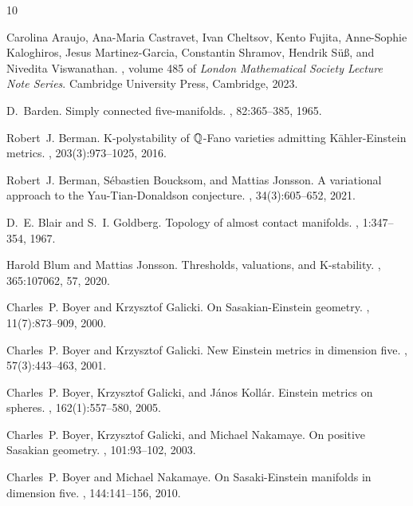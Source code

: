 \documentclass[12pt]{amsart}
\theoremstyle{definition}
\theoremstyle{remark}
\begin{document}
   
\begin{thebibliography}{10}


Carolina Araujo, Ana-Maria Castravet, Ivan Cheltsov, Kento Fujita, Anne-Sophie
  Kaloghiros, Jesus Martinez-Garcia, Constantin Shramov, Hendrik S\"u\ss, and
  Nivedita Viswanathan.
, volume 485 of {\em
  London Mathematical Society Lecture Note Series}.
\newblock Cambridge University Press, Cambridge, 2023.

D.~Barden.
\newblock Simply connected five-manifolds.
, 82:365--385, 1965.

Robert~J. Berman.
\newblock K-polystability of {${\Bbb Q}$}-{F}ano varieties admitting
  {K}\"ahler-{E}instein metrics.
, 203(3):973--1025, 2016.

Robert~J. Berman, S\'ebastien Boucksom, and Mattias Jonsson.
\newblock A variational approach to the {Y}au-{T}ian-{D}onaldson conjecture.
, 34(3):605--652, 2021.

D.~E. Blair and S.~I. Goldberg.
\newblock Topology of almost contact manifolds.
, 1:347--354, 1967.

Harold Blum and Mattias Jonsson.
\newblock Thresholds, valuations, and {K}-stability.
, 365:107062, 57, 2020.

Charles~P. Boyer and Krzysztof Galicki.
\newblock On {S}asakian-{E}instein geometry.
, 11(7):873--909, 2000.

Charles~P. Boyer and Krzysztof Galicki.
\newblock New {E}instein metrics in dimension five.
, 57(3):443--463, 2001.

Charles~P. Boyer, Krzysztof Galicki, and J\'{a}nos Koll\'{a}r.
\newblock Einstein metrics on spheres.
, 162(1):557--580, 2005.

Charles~P. Boyer, Krzysztof Galicki, and Michael Nakamaye.
\newblock On positive {S}asakian geometry.
, 101:93--102, 2003.

Charles~P. Boyer and Michael Nakamaye.
\newblock On {S}asaki-{E}instein manifolds in dimension five.
, 144:141--156, 2010.


\end{thebibliography}
\end{document}
